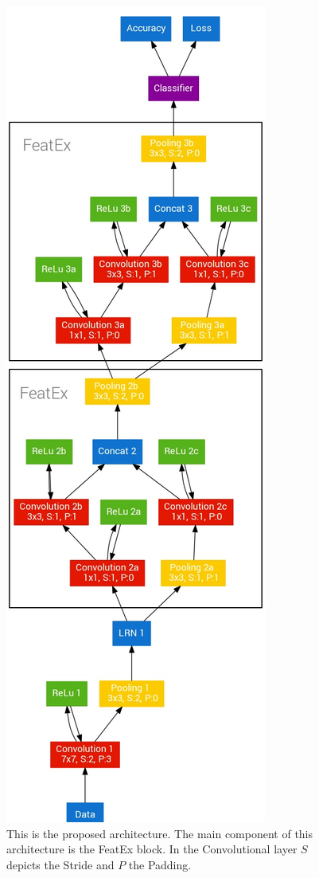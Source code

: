 \begin{figure}[]%
\centering
\includegraphics[scale=0.30]{Fig4}

\caption{This is the proposed architecture. The main component of this architecture is the FeatEx block. In the Convolutional layer $S$ depicts the Stride and $P$ the Padding.}
\label{fig:architecture}
\end{figure}



